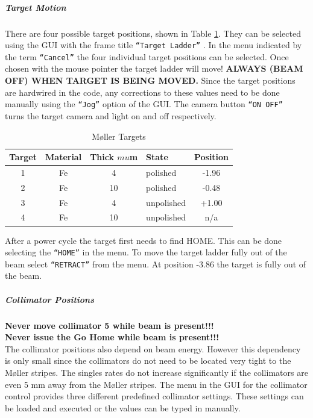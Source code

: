 %
\subparagraph{Target Motion}
There are four possible target positions, shown in Table \ref{tab_moltar}. They
can be selected using the GUI  
with the frame title {\tt ``Target Ladder''} . In the menu indicated
by the term {\tt ``Cancel''} the four individual target positions 
can be selected. Once chosen with the mouse pointer the 
target ladder will move! {\bf ALWAYS (BEAM OFF) WHEN TARGET IS BEING MOVED.}
Since the target positions are hardwired in the code, any 
corrections to these values need to be done manually using 
the {\tt ``Jog''} option of the GUI. The camera button {\tt ``ON OFF'' }
turns  the target camera and light on and off respectively.
\begin{table}
\begin{center}
\begin{tabular}{|c|c|c|l|c|} \hline
Target & Material & Thick $mu$m & State & Position \\
\hline
1 & Fe & 4  & polished   & -1.96   \\
2 & Fe & 10 & polished   & -0.48  \\
3 & Fe & 4  & unpolished & +1.00  \\
4 & Fe & 10 & unpolished &  n/a \\
\hline 
\end{tabular}
\parbox{10cm}{
\caption{M\o ller Targets\label{tab_moltar}}}
\end{center}
\end{table}
%
After a power cycle the target first needs to find HOME. This can
be done selecting the {\tt ``HOME''} in the menu. To move the target
ladder fully out of the beam select  {\tt ``RETRACT''} from the menu.
At position -3.86 the target is fully out of the beam.
%
\subparagraph{Collimator Positions}
{\bf Never move collimator 5 while beam is present!!!}\\
{\bf Never issue the Go Home while beam is present!!!}\\
The collimator positions also depend on beam energy. However
this dependency is only small since the collimators do not need
to be located very tight to the M\o ller stripes. The singles rates 
do not increase significantly if the collimators are even 5 mm away 
from the M\o ller stripes. The menu in the GUI for the collimator
control provides three different predefined collimator settings.
These settings can be loaded and executed or the values
can be typed in manually.

